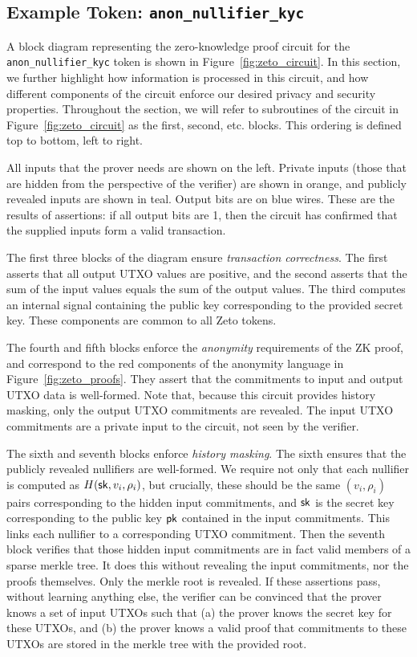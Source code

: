 \subsection{Example Token: \texttt{anon\_nullifier\_kyc}}

A block diagram representing the zero-knowledge proof circuit for the \texttt{anon\_nullifier\_kyc} token is shown in Figure~\ref{fig:zeto_circuit}. In this section, we further highlight how information is processed in this circuit, and how different components of the circuit enforce our desired privacy and security properties. Throughout the section, we will refer to subroutines of the circuit in Figure~\ref{fig:zeto_circuit} as the first, second, etc. blocks. This ordering is defined top to bottom, left to right.

All inputs that the prover needs are shown on the left. Private inputs (those that are hidden from the perspective of the verifier) are shown in orange, and publicly revealed inputs are shown in teal. Output bits are on blue wires. These are the results of assertions: if all output bits are 1, then the circuit has confirmed that the supplied inputs form a valid transaction.

The first three blocks of the diagram ensure \textit{transaction correctness}. The first asserts that all output UTXO values are positive, and the second asserts that the sum of the input values equals the sum of the output values. The third computes an internal signal containing the public key corresponding to the provided secret key. These components are common to all Zeto tokens.

The fourth and fifth blocks enforce the \textit{anonymity} requirements of the ZK proof, and correspond to the red components of the anonymity language in Figure~\ref{fig:zeto_proofs}. They assert that the commitments to input and output UTXO data is well-formed. Note that, because this circuit provides history masking, only the output UTXO commitments are revealed. The input UTXO commitments are a private input to the circuit, not seen by the verifier.

The sixth and seventh blocks enforce \textit{history masking}. The sixth ensures that the publicly revealed nullifiers are well-formed. We require not only that each nullifier is computed as $H(\mathsf{sk}, v_i, \rho_i)$, but crucially, these should be the same $(v_i, \rho_i)$ pairs corresponding to the hidden input commitments, and $\mathsf{sk}$ is the secret key corresponding to the public key $\mathsf{pk}$ contained in the input commitments. This links each nullifier to a corresponding UTXO commitment. Then the seventh block verifies that those hidden input commitments are in fact valid members of a sparse merkle tree. It does this without revealing the input commitments, nor the proofs themselves. Only the merkle root is revealed. If these assertions pass, without learning anything else, the verifier can be convinced that the prover knows a set of input UTXOs such that (a) the prover knows the secret key for these UTXOs, and (b) the prover knows a valid proof that commitments to these UTXOs are stored in the merkle tree with the provided root.

